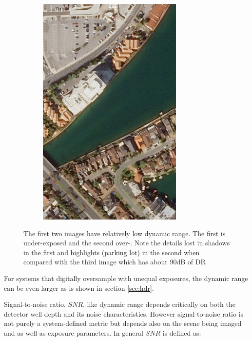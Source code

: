 \documentclass[10pt,journal]{IEEEtran}  %
\begin{document}
\begin{figure}[h!]
\begin{subfigure}{0.31\linewidth}
\includegraphics[width = \textwidth]{figures/pb_good_dr.png}
\end{subfigure}
\caption{The first two images have relatively low dynamic range.  The first is under-exposed and the second over-.  Note the details lost in shadows in the first and highlights (parking lot) in the second when compared with the third image which has about 90dB of DR}
\end{figure}

For systems that digitally oversample with unequal exposures, the dynamic range can be even larger as is shown in section \ref{sec:hdr}.

Signal-to-noise ratio, $SNR$, like dynamic range depends critically on both the detector well depth and its noise characteristics.  However signal-to-noise ratio is not purely a system-defined metric but depends also on the scene being imaged and as well as exposure parameters.  In general $SNR$ is defined as:
\end{document}
